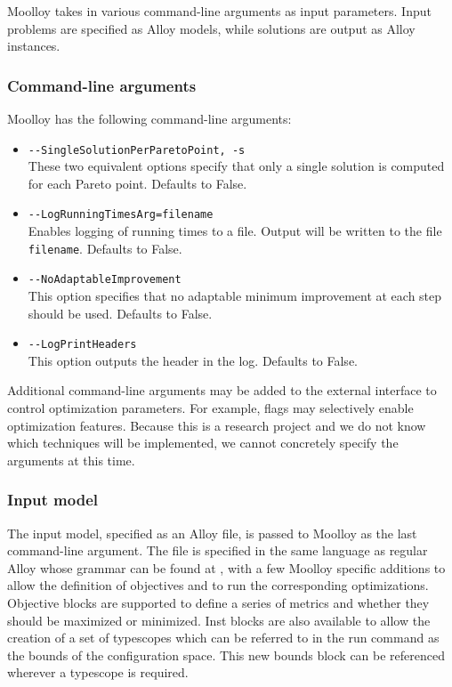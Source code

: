 \documentclass[11pt]{article}
\theoremstyle{definition}
\begin{document}
Moolloy takes in various command-line arguments as input parameters.
Input problems are specified as Alloy models, while solutions are
output as Alloy instances.

\subsubsection{Command-line arguments}\label{sec:cl_args}

Moolloy has the following command-line arguments:

\begin{itemize}
  \item \verb|--SingleSolutionPerParetoPoint, -s|\\
  These two equivalent options specify that only a single solution is
  computed for each Pareto point. Defaults to False.


  \item \verb|--LogRunningTimesArg=filename|\\
  Enables logging of running times to a file. Output will be written to the
  file \texttt{filename}. Defaults to False.

  \item \verb|--NoAdaptableImprovement|\\
  This option specifies that no adaptable minimum improvement at each
  step should be used. Defaults to False.

  \item \verb|--LogPrintHeaders|\\
  This option outputs the header in the log. Defaults to False.
\end{itemize}

Additional command-line arguments may be added to the external
interface to control optimization parameters. For example, flags may
selectively enable optimization features. Because this is a research
project and we do not know which techniques will be implemented, we
cannot concretely specify the arguments at this time.

\subsubsection{Input model}\label{sec:in_model}

The input model, specified as an Alloy file, is passed to Moolloy as
the last command-line argument. The file is specified in the same
language as regular Alloy whose grammar can be found at
\cite{ref:alloy_grammar}, with a few Moolloy specific additions to
allow the definition of objectives and to run the corresponding
optimizations. Objective blocks are supported to define a series of
metrics and whether they should be maximized or minimized. Inst blocks
are also available to allow the creation of a set of typescopes which
can be referred to in the run command as the bounds of the
configuration space. This new bounds block can be referenced wherever a
typescope is required.
\end{document}
